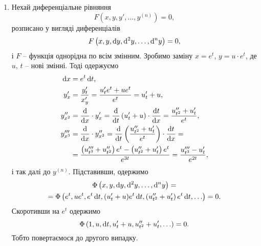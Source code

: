 \begin{enumerate}
\item Нехай диференціальне рівняння
\begin{equation*}
	F \left( x, y, y', \ldots, y^{(n)} \right) = 0,
\end{equation*}
розписано у вигляді диференціалів
\begin{equation*}
	F \left( x, y, \mathop{}\!\mathrm{d} y, \mathop{}\!\mathrm{d}^2 y , \ldots, \mathop{}\!\mathrm{d}^n y \right) = 0,
\end{equation*}
і $F$ -- функція однорідна по всім змінним. Зробимо заміну $x = e^t$, $y = u \cdot e^t$, де $u$, $t$ -- нові змінні. Тоді одержуємо
\begin{align*}
	\diff x &= e^t \diff t, \\
	y_x^\prime &=  \frac{y_t^\prime}{x_y^\prime} = \frac{u_t^\prime e^t + u e^t}{e^t} = u_t^\prime + u, \\
	y_{x^2}^{\prime\prime} &= \frac{\diff}{\diff x} \cdot y_x^\prime = \frac{\diff}{\diff t} \left( u_t^\prime + u \right) \cdot \frac{\diff t}{\diff x} = \frac{u_{t^2}^{\prime\prime} + u_t^\prime}{e^t}, \\
	y_{x^3}^{\prime\prime\prime} &= \frac{\diff}{\diff x} \cdot y_{x^2}^{\prime\prime} = \frac{\diff}{\diff t} \left( \frac{u_{t^2}^{\prime\prime} + u_t^\prime }{e^t} \right) \cdot \frac{\diff t}{\diff x} = \\
	&= \frac{\left( u_{t^3}^{\prime\prime\prime} + u_{t^2}^{\prime\prime} \right) e^t - \left( u_{t^2}^{\prime\prime} + u_t^\prime \right) e^t}{e^{3t}} = \frac{u_{t^3}^{\prime\prime\prime} - u_t^\prime}{e^{2t}}, \nonumber
\end{align*}
і так далі до $y^{(n)}$. Підставивши, одержимо
\begin{multline*}
	\Phi \left(x, y, \mathop{}\!\mathrm{d} y, \mathop{}\!\mathrm{d}^2 y, \ldots, \mathop{}\!\mathrm{d}^n y\right) = \\
	= \Phi\left( e^t, u e^t, e^t \mathop{}\!\mathrm{d} t, (u_t^\prime + u)e^t \mathop{}\!\mathrm{d} t, \left(u_{t^2}^{\prime\prime} + u_t^\prime\right) e^t \mathop{}\!\mathrm{d} t, \ldots\right) = 0.
\end{multline*} 
Скоротивши на $e^t$ одержимо
\begin{equation*}
	\Phi\left( 1, u, \mathop{}\!\mathrm{d} t, u_t^\prime + u, u_{t^2}^{\prime\prime} + u_t^\prime, \ldots\right) = 0.
\end{equation*} 
Тобто повертаємося до другого випадку.
\end{enumerate}